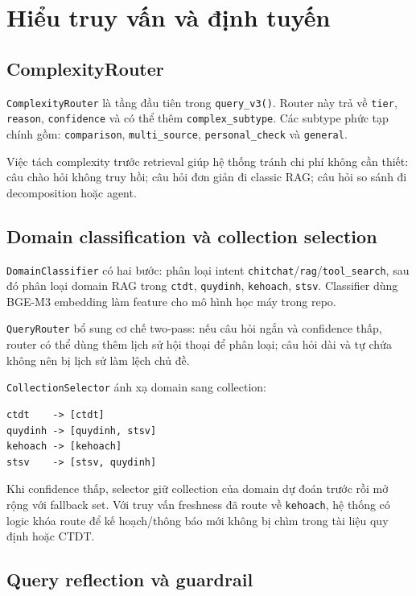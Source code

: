 \documentclass[../DoAn.tex]{subfiles}
\begin{document}
\section{Hiểu truy vấn và định tuyến}

\subsection{ComplexityRouter}

\texttt{ComplexityRouter} là tầng đầu tiên trong \texttt{query\_v3()}. Router này
trả về \texttt{tier}, \texttt{reason}, \texttt{confidence} và có thể thêm
\texttt{complex\_subtype}. Các subtype phức tạp chính gồm:
\texttt{comparison}, \texttt{multi\_source}, \texttt{personal\_check} và
\texttt{general}.

Việc tách complexity trước retrieval giúp hệ thống tránh chi phí không cần thiết:
câu chào hỏi không truy hồi; câu hỏi đơn giản đi classic RAG; câu hỏi so sánh đi
decomposition hoặc agent.

\subsection{Domain classification và collection selection}

\texttt{DomainClassifier} có hai bước: phân loại intent
\texttt{chitchat}/\texttt{rag}/\texttt{tool\_search}, sau đó phân loại domain RAG
trong \texttt{ctdt}, \texttt{quydinh}, \texttt{kehoach}, \texttt{stsv}. Classifier
dùng BGE-M3 embedding làm feature cho mô hình học máy trong repo.

\texttt{QueryRouter} bổ sung cơ chế two-pass: nếu câu hỏi ngắn và confidence
thấp, router có thể dùng thêm lịch sử hội thoại để phân loại; câu hỏi dài và tự
chứa không nên bị lịch sử làm lệch chủ đề.

\texttt{CollectionSelector} ánh xạ domain sang collection:

\begin{verbatim}
ctdt    -> [ctdt]
quydinh -> [quydinh, stsv]
kehoach -> [kehoach]
stsv    -> [stsv, quydinh]
\end{verbatim}

Khi confidence thấp, selector giữ collection của domain dự đoán trước rồi mở
rộng với fallback set. Với truy vấn freshness đã route về \texttt{kehoach}, hệ
thống có logic khóa route để kế hoạch/thông báo mới không bị chìm trong tài liệu
quy định hoặc CTDT.

\subsection{Query reflection và guardrail}
\end{document}
